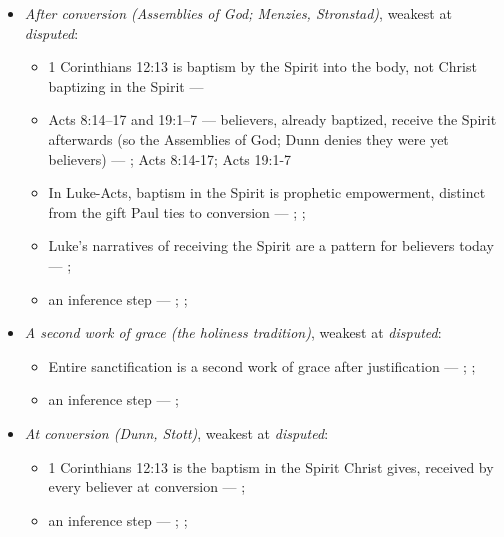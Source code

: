 \documentclass[11pt]{article}
\begin{document}
\begin{itemize}
\item \emph{After conversion (Assemblies of God; Menzies, Stronstad)}, weakest at \emph{disputed}:
\begin{itemize}
\item 1 Corinthians 12:13 is baptism by the Spirit into the body, not Christ baptizing in the Spirit --- \cite{assemblies-of-god-baptism-holy-spirit-2010}
\item Acts 8:14–17 and 19:1–7 — believers, already baptized, receive the Spirit afterwards (so the Assemblies of God; Dunn denies they were yet believers) --- \cite{assemblies-of-god-baptism-holy-spirit-2010}; Acts 8:14-17; Acts 19:1-7
\item In Luke-Acts, baptism in the Spirit is prophetic empowerment, distinct from the gift Paul ties to conversion --- \cite{menzies-lukes-understanding-2017}; \cite{menzies-empowered-witness-1994}; \cite{stronstad-charismatic-theology-1984}
\item Luke’s narratives of receiving the Spirit are a pattern for believers today --- \cite{stronstad-charismatic-theology-1984}; \cite{assemblies-of-god-baptism-holy-spirit-2010}
\item an inference step --- \cite{assemblies-of-god-baptism-holy-spirit-2010}; \cite{dunn-baptism-holy-spirit-1970}; \cite{stott-baptism-fullness-1975}
\end{itemize}
\item \emph{A second work of grace (the holiness tradition)}, weakest at \emph{disputed}:
\begin{itemize}
\item Entire sanctification is a second work of grace after justification --- \cite[Articles of Faith, X, ¶10]{church-of-the-nazarene-manual-2023}; \cite[to Joseph Benson, 28 December 1770]{wesley-letters-1931}; \cite{bassett-white-paper-article-x-2010}
\item an inference step --- \cite[to Joseph Benson, 28 December 1770]{wesley-letters-1931}; \cite{bassett-white-paper-article-x-2010}
\end{itemize}
\item \emph{At conversion (Dunn, Stott)}, weakest at \emph{disputed}:
\begin{itemize}
\item 1 Corinthians 12:13 is the baptism in the Spirit Christ gives, received by every believer at conversion --- \cite{dunn-baptism-holy-spirit-1970}; \cite{stott-baptism-fullness-1975}
\item an inference step --- \cite{dunn-baptism-holy-spirit-1970}; \cite{stott-baptism-fullness-1975}; \cite{assemblies-of-god-baptism-holy-spirit-2010}

\end{itemize}
\end{itemize}
\end{document}
